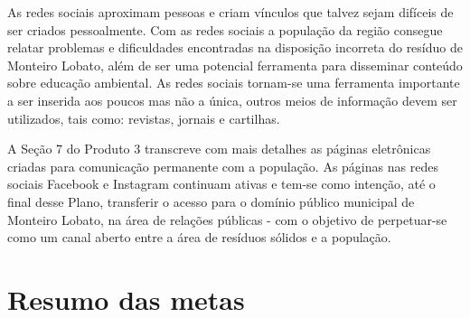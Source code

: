 As redes sociais aproximam pessoas e criam vínculos que talvez sejam difíceis de ser criados pessoalmente. Com as redes sociais a população da região consegue relatar problemas e dificuldades encontradas na disposição incorreta do resíduo de Monteiro Lobato, além de ser uma potencial ferramenta para disseminar conteúdo sobre educação ambiental. As redes sociais tornam-se uma ferramenta importante a ser inserida aos poucos mas não a única, outros meios de informação devem ser utilizados, tais como: revistas, jornais e cartilhas.

A Seção 7 do Produto 3 transcreve com mais detalhes as páginas eletrônicas criadas para comunicação permanente com a população. As páginas nas redes sociais Facebook e Instagram continuam ativas e tem-se como intenção, até o final desse Plano, transferir o acesso para o domínio público municipal de Monteiro Lobato, na área de relações públicas - com o objetivo de perpetuar-se como um canal aberto entre a área de resíduos sólidos e a população.

\section{Resumo das metas}


